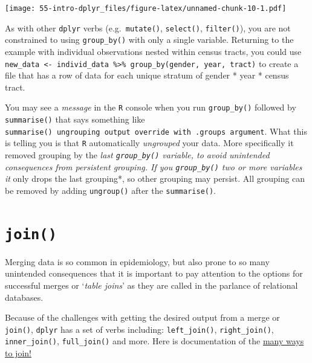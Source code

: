 \documentclass[
]{book}
\newenvironment{rmdnote}[1]
  {
  \begin{itemize}
  \renewcommand{\labelitemi}{
    \raisebox{-.7\height}[0pt][0pt]{
      {\setkeys{Gin}{width=3em,keepaspectratio}\texttt{[image: images/\#1]}}
    }
  }
  \setlength{\fboxsep}{1em}
  \begin{note}
  \item
  }
  {
  \end{note}
  \end{itemize}
  }
\newenvironment{rmdtip}[1]
  {
  \begin{itemize}
  \renewcommand{\labelitemi}{
    \raisebox{-.7\height}[0pt][0pt]{
      {\setkeys{Gin}{width=3em,keepaspectratio}\texttt{[image: images/\#1]}}
    }
  }
  \setlength{\fboxsep}{1em}
  \begin{tip}
  \item
  }
  {
  \end{tip}
  \end{itemize}
  }
\begin{document}
\texttt{[image: 55-intro-dplyr\_files/figure-latex/unnamed-chunk-10-1.pdf]}

\begin{rmdtip}{tip}
As with other \texttt{dplyr} verbs (e.g.~\texttt{mutate()}, \texttt{select()}, \texttt{filter()}), you are not constrained to using \texttt{group\_by()} with only a single variable. Returning to the example with individual observations nested within census tracts, you could use \texttt{new\_data\ \textless{}-\ individ\_data\ \%\textgreater{}\%\ group\_by(gender,\ year,\ tract)} to create a file that has a row of data for each unique stratum of gender * year * census tract.

\end{rmdtip}

\begin{rmdnote}{note}
You may see a \emph{message} in the \texttt{R} console when you run \texttt{group\_by()} followed by \texttt{summarise()} that says something like \texttt{summarise()\ ungrouping\ output\ override\ with\ .groups\ argument}. What this is telling you is that \texttt{R} automatically \emph{ungrouped} your data. More specifically it removed grouping by the \emph{last \texttt{group\_by()} variable, to avoid unintended consequences from persistent grouping. If you \texttt{group\_by()} two or more variables it }only drops the last grouping*, so other grouping may persist. All grouping can be removed by adding \texttt{ungroup()} after the \texttt{summarise()}.

\end{rmdnote}

\hypertarget{join}{%
\section{\texorpdfstring{\texttt{join()}}{join()}}\label{join}}

Merging data is so common in epidemiology, but also prone to so many unintended consequences that it is important to pay attention to the options for successful merges or `\emph{table joins}' as they are called in the parlance of relational databases.

Because of the challenges with getting the desired output from a merge or \texttt{join()}, \texttt{dplyr} has a set of verbs including: \texttt{left\_join()}, \texttt{right\_join()}, \texttt{inner\_join()}, \texttt{full\_join()} and more. Here is documentation of the \href{https://dplyr.tidyverse.org/reference/join.html}{many ways to join!}
\end{document}
